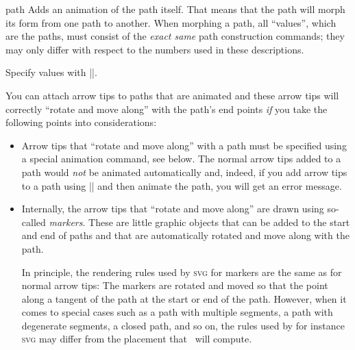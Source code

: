 \begin{sysanimateattribute}{path}
    Adds an animation of the path itself. That means that the path will morph
    its form from one path to another. When morphing a path, all ``values'',
    which are the paths, must consist of the \emph{exact same} path
    construction commands; they may only differ with respect to the numbers
    used in these descriptions.

    Specify values with |\pgfsysanimvalpath|.
\begin{codeexample}[imagesource={standalone/pgfmanual-en-pgfsys-animations-animation-9.svg}]
\end{codeexample}

    You can attach arrow tips to paths that are animated and these arrow tips
    will correctly ``rotate and move along'' with the path's end points
    \emph{if} you take the following points into considerations:
    \begin{itemize}
        \item Arrow tips that ``rotate and move along'' with a path must be
            specified using a special animation command, see below. The normal
            arrow tips added to a path would \emph{not} be animated
            automatically and, indeed, if you add arrow tips to a path using
            |\pgfsetarrows| and then animate the path, you will get an error
            message.
        \item Internally, the arrow tips that ``rotate and move along'' are
            drawn using so-called \emph{markers}. These are little graphic
            objects that can be added to the start and end of paths and that
            are automatically rotated and move along with the path.

            In principle, the rendering rules used by \textsc{svg} for markers
            are the same as for normal arrow tips: The markers are rotated and
            moved so that the point along a tangent of the path at the start or
            end of the path. However, when it comes to special cases such as a
            path with multiple segments, a path with degenerate segments, a
            closed path, and so on, the rules used by for instance \textsc{svg}
            may differ from the placement that \pgfname\ will compute.


\end{itemize}
\end{sysanimateattribute}
